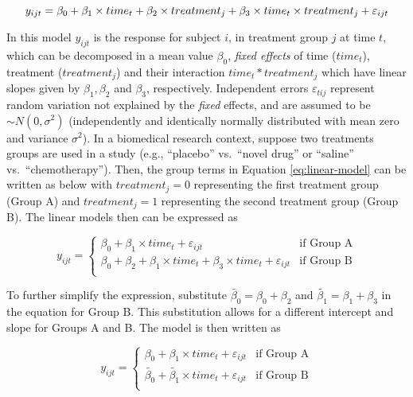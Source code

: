 \documentclass[
]{article}
\begin{document}
\begin{equation}
y_{ijt} = \beta_0+\beta_1 \times time_{t} +\beta_2 \times treatment_{j} +\beta_3 \times time_{t}\times treatment_{j}+\varepsilon_{ijt}\\ 
\label{eq:linear-model}
\end{equation}

In this model \(y_{ijt}\) is the response for subject \(i\), in treatment group \(j\) at time \(t\), which can be decomposed in a mean value \(\beta_0\), \emph{fixed effects} of time (\(time_t\)), treatment (\(treatment_j\)) and their interaction \(time_t*treatment_j\) which have linear slopes given by \(\beta_1, \beta_2\) and \(\beta_3\), respectively. Independent errors \(\varepsilon_{tij}\) represent random variation not explained by the \emph{fixed} effects, and are assumed to be \(\sim N(0,\sigma^2)\) (independently and identically normally distributed with mean zero and variance \(\sigma^2\)).
In a biomedical research context, suppose two treatments groups are used in a study (e.g., ``placebo'' vs.~``novel drug'' or ``saline'' vs.~``chemotherapy''). Then, the group terms in Equation \eqref{eq:linear-model} can be written as below with \(treatment_j=0\) representing the first treatment group (Group A) and \(treatment_j=1\) representing the second treatment group (Group B). The linear models then can be expressed as

\begin{equation}
y_{ijt} = \begin{cases}
\beta_0 + \beta_1\times time_{t}+\varepsilon_{ijt}   & \mbox{if Group A}\\
\beta_0 + \beta_2+\beta_1 \times time_{t} +\beta_3 \times time_{t}+\varepsilon_{ijt}  & \mbox{if Group B}\\
\end{cases}
\label{eq:ANOVA-by-group}
\end{equation}

To further simplify the expression, substitute \(\widetilde{\beta_{0}}=\beta_0+\beta_{2}\) and \(\widetilde{\beta_{1}}=\beta_{1}+\beta_{3}\) in the equation for Group B. This substitution allows for a different intercept and slope for Groups A and B. The model is then written as

\begin{equation}
y_{ijt} = \begin{cases}
\beta_0 + \beta_1\times time_{t}+\varepsilon_{ijt}   & \mbox{if Group A}\\
\widetilde{\beta_{0}} + \widetilde{\beta_1} \times time_{t}+\varepsilon_{ijt}  & \mbox{if Group B}\\
\end{cases}
\label{eq:ANOVA-lines}
\end{equation}
\end{document}
